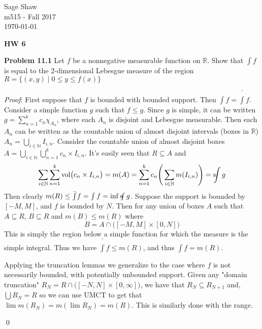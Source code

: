 \documentclass[12pt]{article}
\newcommand{\problem}[1]{\hspace{-4 ex} \large \textbf{Problem #1} }
\newcommand{\sint}{\text{s}\kern-5pt\int}
\renewenvironment{proof}{\hspace{-4 ex} \emph{Proof}:}{\qed}
\begin{document}
	\thispagestyle{empty}
	
	\begin{flushright}
		Sage Shaw \\
		m515 - Fall 2017 \\
		\today
	\end{flushright}
	
{\large \textbf{HW 6}}\bigbreak

\problem{11.1} Let $f$ be a nonnegative measurable function on $\mathbb{R}$. Show that $\int f$ is equal to the $2$-dimensional Lebesgue measure of the region $R = \{(x,y)\mid 0\leq y \leq f(x) \}$
	
	\begin{proof}
		First suppose that $f$ is bounded with bounded support. Then $\int f = \bar{\int} f$. Consider a simple function $g$ such that $f \leq g$. Since $g$ is simple, it can be written $g = \sum\limits_{n=1}^k c_n \chi_{A_n}$, where each $A_n$ is disjoint and Lebesgue measurable. Then each $A_n$ can be written as the countable union of almost disjoint intervals (boxes in $\mathbb{R}$) $A_n = \bigcup\limits_{i \in \mathbb{N}}I_{i,n}$. Consider the countable union of almost disjoint boxes $A = \bigcup\limits_{i \in \mathbb{N}} \bigcup\limits_{n=1}^k c_n \times I_{i,n}$. It's easily seen that $R \subseteq A$ and 
		$$
		\sum\limits_{i \in \mathbb{N}} \sum\limits_{n=1}^k \text{vol}\big( c_n \times I_{i,n} \big) = m(A) =  \sum\limits_{n=1}^k c_n \Bigg( \sum\limits_{i \in \mathbb{N}} m(I_{i,n}) \Bigg) = \sint g
		$$
		Then clearly $m(R) \leq \bar{\int}f = \int f = \inf{\sint g}$. Suppose the support is bounded by $[-M,M]$, and $f$ is bounded by $N$. Then for any union of boxes $A$ such that $A \subseteq R$, $B \subseteq R$ and $m(B) \leq m(R)$ where
		$$
		B =  A \cap \big([-M,M] \times [0,N] \big)
		$$
		This is simply the region below a simple function for which the measure is the simple integral. Thus we have $\bar{\int}f \leq m(R)$, and thus $\int f = m(R)$. \bigbreak
		
		Applying the truncation lemmas we generalize to the case where $f$ is not necessarily bounded, with potentially unbounded support. Given any "domain truncation" $R_N = R \cap \Big( [-N,N] \times [0,\infty] \Big)$, we have that $R_N \subseteq R_{N+1}$ and, $\bigcup R_N = R$ so we can use UMCT to get that $\lim m(R_N) = m( \lim R_N) = m(R)$. This is similarly done with the range. 	
		
	\end{proof}
\end{document}
